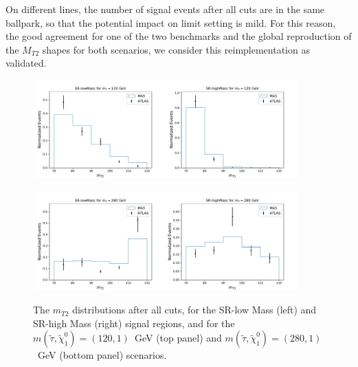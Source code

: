 \documentclass{ws-mpla}
\begin{document}
On different lines, the number of signal events after all cuts are in the same ballpark, so that the potential impact on limit setting is mild. For this reason, the good agreement for one of the two benchmarks and the global reproduction of the $M_{T2}$ shapes for both scenarios, we consider this reimplementation as validated.

\begin{figure}[t]
  \centerline{\includegraphics[width=2.0in]{m120_SRlow}\includegraphics[width=2.0in]{m120_SRhigh}}
  \vspace*{8pt}
  \centerline{\includegraphics[width=2.0in]{m280_SRlow}\includegraphics[width=2.0in]{m280_SRhigh}}
  \caption{The $m_{T2}$ distributions after all cuts, for the SR-low Mass (left) and SR-high Mass (right) signal regions, and for the $m(\tilde{\tau},\tilde{\chi}^0_1)=(120,1)$~GeV (top panel) and $m(\tilde{\tau},\tilde{\chi}^0_1)=(280,1)$~GeV (bottom panel) scenarios.\protect\label{fig:mt2}}
\end{figure}
\end{document}
